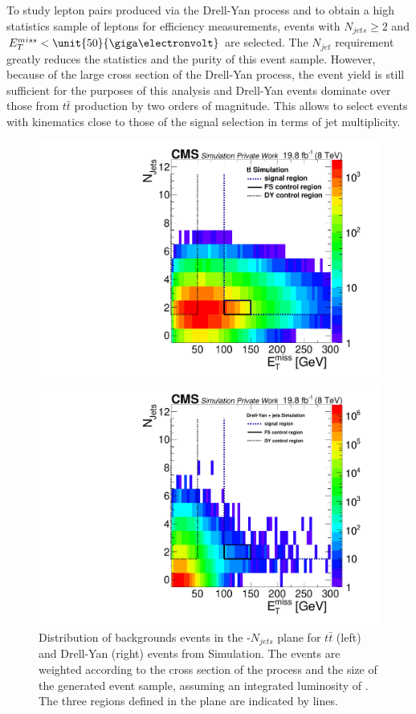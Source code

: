 To study lepton pairs produced via the Drell-Yan process and to obtain a high statistics sample of leptons for efficiency measurements, events with $N_{jets} \geq 2$ and $\MET < \unit{50}{\giga\electronvolt}$ are selected. The $N_{jet}$ requirement greatly reduces the statistics and the purity of this event sample. However, because of the large cross section of the Drell-Yan process, the event yield is still sufficient for the purposes of this analysis and Drell-Yan events dominate over those from $t\bar{t}$ production by two orders of magnitude. This allows to select events with kinematics close to those of the signal selection in terms of jet multiplicity.
\begin{figure}[htbp]
\centering
\begin{minipage}[t]{0.49\textwidth}
  \includegraphics[width=\textwidth]{plots/SELECTION/metJetsScatter_ttbar.pdf}
\end{minipage}
\begin{minipage}[t]{0.49\textwidth}
\includegraphics[width=\textwidth]{plots/SELECTION/metJetsScatter_DY.pdf}
\end{minipage}
\caption{Distribution of backgrounds events in the \MET-$N_{jets}$ plane for $t\bar{t}$ (left) and Drell-Yan (right) events from Simulation. The events are weighted according to the cross section of the process and the size of the generated event sample, assuming an integrated luminosity of \lumi. The three regions defined in the plane are indicated by lines.}
\label{fig:sigRegionBG}
\end{figure}    
